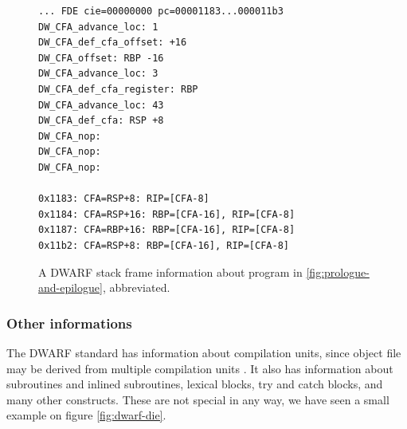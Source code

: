 \begin{figure}
    \begin{lstlisting}
... FDE cie=00000000 pc=00001183...000011b3
DW_CFA_advance_loc: 1
DW_CFA_def_cfa_offset: +16
DW_CFA_offset: RBP -16
DW_CFA_advance_loc: 3
DW_CFA_def_cfa_register: RBP
DW_CFA_advance_loc: 43
DW_CFA_def_cfa: RSP +8
DW_CFA_nop:
DW_CFA_nop:
DW_CFA_nop:

0x1183: CFA=RSP+8: RIP=[CFA-8]
0x1184: CFA=RSP+16: RBP=[CFA-16], RIP=[CFA-8]
0x1187: CFA=RBP+16: RBP=[CFA-16], RIP=[CFA-8]
0x11b2: CFA=RSP+8: RBP=[CFA-16], RIP=[CFA-8]
    \end{lstlisting}
    \caption{A DWARF stack frame information about program in
             \ref{fig:prologue-and-epilogue}, abbreviated.}
    \label{fig:dwarf-stack-frames}
\end{figure}

\begin{figure}
\end{figure}

\subsubsection{Other informations}
The DWARF standard has information about compilation units, since object file
may be derived from multiple compilation units \cite{dwarf}. It also has
information about subroutines and inlined subroutines, lexical blocks, try and
catch blocks, and many other constructs. These are not special in any way, we
have seen a small example on figure \ref{fig:dwarf-die}.

